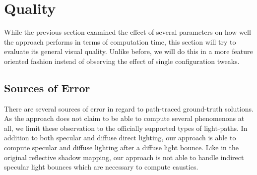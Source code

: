 \documentclass[thesis.tex]{subfiles}
\begin{document}

\newpage



\section{Quality}
While the previous section examined the effect of several parameters on how well the approach performs in terms of computation time, this section will try to evaluate its general visual quality.
Unlike before, we will do this in a more feature oriented fashion instead of observing the effect of single configuration tweaks.

\subsection{Sources of Error}
There are several sources of error in regard to path-traced ground-truth solutions.
As the approach does not claim to be able to compute several phenomenons at all, we limit these observation to the officially supported types of light-paths.
In addition to both specular and diffuse direct lighting, our approach is able to compute specular and diffuse lighting after a diffuse light bounce.
Like in the original reflective shadow mapping, our approach is not able to handle indirect specular light bounces which are necessary to compute caustics.
\end{document}
